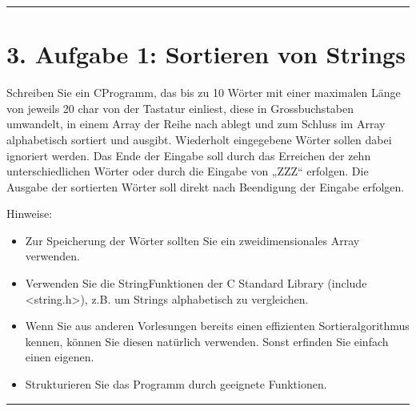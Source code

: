 \documentclass[a4paper,10pt,english]{report}
\begin{document}
\bigskip\hrule\bigskip



\section{3. Aufgabe 1: Sortieren von Strings}
\label{\detokenize{P05_TicTacToe/README:aufgabe-1-sortieren-von-strings}}
\sphinxAtStartPar
Schreiben Sie ein C\sphinxhyphen{}Programm, das bis zu 10 Wörter mit einer maximalen Länge von jeweils 20 char von der Tastatur einliest, diese in Grossbuchstaben umwandelt, in einem Array der Reihe nach ablegt und zum Schluss im Array alphabetisch sortiert und ausgibt. Wiederholt eingegebene Wörter sollen dabei ignoriert werden. Das Ende der Eingabe soll durch das Erreichen der zehn unterschiedlichen Wörter oder durch die Eingabe von „ZZZ“ erfolgen. Die Ausgabe der sortierten Wörter soll direkt nach Beendigung der Eingabe erfolgen.

\sphinxAtStartPar
Hinweise:
\begin{itemize}
\item {} 
\sphinxAtStartPar
Zur Speicherung der Wörter sollten Sie ein zweidimensionales Array verwenden.

\item {} 
\sphinxAtStartPar
Verwenden Sie die String\sphinxhyphen{}Funktionen der C Standard Library (include \textless{}string.h\textgreater{}), z.B. um Strings alphabetisch zu vergleichen.

\item {} 
\sphinxAtStartPar
Wenn Sie aus anderen Vorlesungen bereits einen effizienten Sortieralgorithmus kennen, können Sie diesen natürlich verwenden. Sonst erfinden Sie einfach einen eigenen.

\item {} 
\sphinxAtStartPar
Strukturieren Sie das Programm durch geeignete Funktionen.

\end{itemize}


\bigskip\hrule\bigskip
\end{document}
